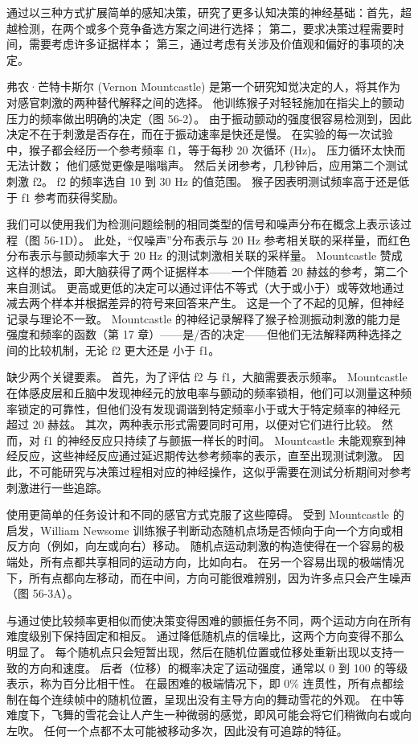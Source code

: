 通过以三种方式扩展简单的感知决策，研究了更多认知决策的神经基础：首先，超越检测，在两个或多个竞争备选方案之间进行选择； 第二，要求决策过程需要时间，需要考虑许多证据样本； 第三，通过考虑有关涉及价值观和偏好的事项的决定。

弗农·芒特卡斯尔 (Vernon Mountcastle) 是第一个研究知觉决定的人，将其作为对感官刺激的两种替代解释之间的选择。 他训练猴子对轻轻施加在指尖上的颤动压力的频率做出明确的决定（图 56-2）。 由于振动颤动的强度很容易检测到，因此决定不在于刺激是否存在，而在于振动速率是快还是慢。 在实验的每一次试验中，猴子都会经历一个参考频率 f1，等于每秒 20 次循环 (Hz)。 压力循环太快而无法计数； 他们感觉更像是嗡嗡声。 然后关闭参考，几秒钟后，应用第二个测试刺激 f2。 f2 的频率选自 10 到 30 Hz 的值范围。 猴子因表明测试频率高于还是低于 f1 参考而获得奖励。

我们可以使用我们为检测问题绘制的相同类型的信号和噪声分布在概念上表示该过程（图 56-1D）。 此处，“仅噪声”分布表示与 20 Hz 参考相关联的采样量，而红色分布表示与颤动频率大于 20 Hz 的测试刺激相关联的采样量。 Mountcastle 赞成这样的想法，即大脑获得了两个证据样本——一个伴随着 20 赫兹的参考，第二个来自测试。 更高或更低的决定可以通过评估不等式（大于或小于）或等效地通过减去两个样本并根据差异的符号来回答来产生。 这是一个了不起的见解，但神经记录与理论不一致。 Mountcastle 的神经记录解释了猴子检测振动刺激的能力是强度和频率的函数（第 17 章）——是/否的决定——但他们无法解释两种选择之间的比较机制，无论 f2 更大还是 小于 f1。

缺少两个关键要素。 首先，为了评估 f2 与 f1，大脑需要表示频率。 Mountcastle 在体感皮层和丘脑中发现神经元的放电率与颤动的频率锁相，他们可以测量这种频率锁定的可靠性，但他们没有发现调谐到特定频率小于或大于特定频率的神经元 超过 20 赫兹。 其次，两种表示形式需要同时可用，以便对它们进行比较。 然而，对 f1 的神经反应只持续了与颤振一样长的时间。 Mountcastle 未能观察到神经反应，这些神经反应通过延迟期传达参考频率的表示，直至出现测试刺激。 因此，不可能研究与决策过程相对应的神经操作，这似乎需要在测试分析期间对参考刺激进行一些追踪。

使用更简单的任务设计和不同的感官方式克服了这些障碍。 受到 Mountcastle 的启发，William Newsome 训练猴子判断动态随机点场是否倾向于向一个方向或相反方向（例如，向左或向右）移动。 随机点运动刺激的构造使得在一个容易的极端处，所有点都共享相同的运动方向，比如向右。 在另一个容易出现的极端情况下，所有点都向左移动，而在中间，方向可能很难辨别，因为许多点只会产生噪声（图 56-3A）。

与通过使比较频率更相似而使决策变得困难的颤振任务不同，两个运动方向在所有难度级别下保持固定和相反。 通过降低随机点的信噪比，这两个方向变得不那么明显了。 每个随机点只会短暂出现，然后在随机位置或位移处重新出现以支持一致的方向和速度。 后者（位移）的概率决定了运动强度，通常以 0 到 100 的等级表示，称为百分比相干性。 在最困难的极端情况下，即 0\% 连贯性，所有点都绘制在每个连续帧中的随机位置，呈现出没有主导方向的舞动雪花的外观。 在中等难度下，飞舞的雪花会让人产生一种微弱的感觉，即风可能会将它们稍微向右或向左吹。 任何一个点都不太可能被移动多次，因此没有可追踪的特征。

